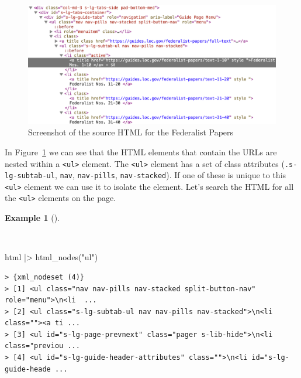 \documentclass[
  letterpaper,
  DIV=11,
  numbers=noendperiod]{scrreport}
\newenvironment{Shaded}{\begin{snugshade}}{\end{snugshade}}
\newcommand{\FunctionTok}[1]{\textcolor[rgb]{0.00,0.00,0.00}{#1}}
\newcommand{\NormalTok}[1]{\textcolor[rgb]{0.00,0.00,0.00}{#1}}
\newcommand{\SpecialCharTok}[1]{\textcolor[rgb]{0.00,0.00,0.00}{#1}}
\newcommand{\StringTok}[1]{\textcolor[rgb]{0.00,0.00,0.00}{#1}}
\theoremstyle{definition}
\newtheorem{example}{Example}[chapter]
\theoremstyle{remark}
\begin{document}
\begin{figure}[H]

{\centering \includegraphics[width=1\textwidth,height=\textheight]{figures/acquire-data/ad-fed-papers-loc-inspect-source.png}

}

\caption{\label{fig-ad-fed-inspect-source}Screenshot of the source HTML
for the Federalist Papers}

\end{figure}

In Figure~\ref{fig-ad-fed-inspect-source} we can see that the HTML
elements that contain the URLs are nested within a
\texttt{\textless{}ul\textgreater{}} element. The
\texttt{\textless{}ul\textgreater{}} element has a set of class
attributes (\texttt{.s-lg-subtab-ul}, \texttt{nav}, \texttt{nav-pills},
\texttt{nav-stacked}). If one of these is unique to this
\texttt{\textless{}ul\textgreater{}} element we can use it to isolate
the element. Let's search the HTML for all the
\texttt{\textless{}ul\textgreater{}} elements on the page.

\begin{example}[]\protect\hypertarget{exm-ad-fed-papers-loc-url-ul}{}\label{exm-ad-fed-papers-loc-url-ul}

~

\begin{Shaded}
\begin{Highlighting}[]
\NormalTok{html }\SpecialCharTok{|\textgreater{}} 
  \FunctionTok{html\_nodes}\NormalTok{(}\StringTok{"ul"}\NormalTok{)}
\end{Highlighting}
\end{Shaded}

\begin{verbatim}
> {xml_nodeset (4)}
> [1] <ul class="nav nav-pills nav-stacked split-button-nav" role="menu">\n<li  ...
> [2] <ul class="s-lg-subtab-ul nav nav-pills nav-stacked">\n<li class=""><a ti ...
> [3] <ul id="s-lg-page-prevnext" class="pager s-lib-hide">\n<li class="previou ...
> [4] <ul id="s-lg-guide-header-attributes" class="">\n<li id="s-lg-guide-heade ...
\end{verbatim}

\end{example}
\end{document}

